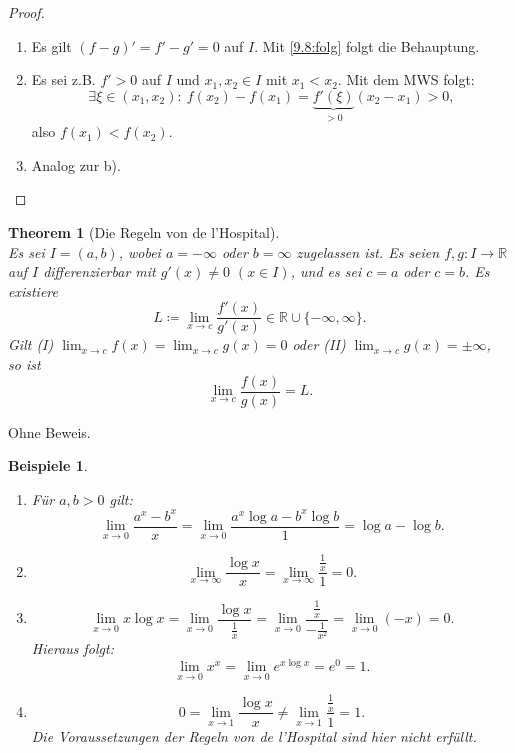 \documentclass[12pt]{extreport} %
\newcommand{\R}{\mathbb{R}}
\theoremstyle{named}
\newtheorem{unnamedtheorem}{Theorem} \counterwithin{unnamedtheorem}{chapter}
\theoremstyle{itshape}
\theoremstyle{normal}
\newtheorem*{beispiele}{Beispiele}
\begin{document}
{\begin{proof}  ~\
	\begin{enumerate}
		\item Es gilt $(f - g)' = f'-g'=0$ auf $I$. Mit \ref{9.8:folg} folgt die Behauptung.
		\item Es sei z.B. $f' > 0$ auf $I$ und $x_{1}, x_{2} \in I$ mit $x_{1} < x_{2}$. Mit dem MWS folgt: 
		$$\exists \xi \in (x_{1}, x_{2}): ~ f(x_{2}) - f(x_{1}) = \underbrace{f'(\xi)}_{> 0} (x_{2} - x_{1}) > 0,$$
		also $f(x_{1}) < f(x_{2})$.
		\item Analog zur b).
	\end{enumerate}
\end{proof}


\begin{unnamedtheorem}[Die Regeln von de l'Hospital] \label{9.11:prop:lHopital} ~\\
	Es sei $I = (a, b)$, wobei $a = -\infty$ oder $b = \infty$ zugelassen ist. Es seien $f, g \colon I \rightarrow \R$ auf $I$ differenzierbar mit 
	$g'(x) \neq 0$ $(x \in I)$, und es sei $c=a$ oder $c=b$. 
	Es existiere
	$$ L \coloneqq \lim_{x \rightarrow c} \frac{f'(x)}{g'(x)}  \in \R \cup \{ - \infty, \infty \}. $$
	Gilt (I) $\lim_{x \rightarrow c} f(x) = \lim_{x \rightarrow c} g(x) = 0$ oder (II) $\lim_{x \rightarrow c} g(x) = \pm \infty$, \\
	so ist 
	$$ \lim_{x \rightarrow c} \frac{f(x)}{g(x)} = L. $$
	\end{unnamedtheorem}

Ohne Beweis.

\begin{beispiele} ~\
	\begin{enumerate}
		\item Für $a, b > 0$ gilt:
		$$\lim_{x \rightarrow 0} \frac{a^{x} - b^{x}}{x} = \lim_{x \rightarrow 0} \frac{a^{x} \log a - b^{x} \log b}{1} = \log a - \log b.$$
		\item $$\lim_{x \rightarrow \infty} \frac{\log x}{x} = \lim_{x \rightarrow \infty} \frac{\frac{1}{x}}{1} = 0.$$
		\item $$\lim_{x \rightarrow 0} x \log x = \lim_{x \rightarrow 0} \frac{\log x}{\frac{1}{x}} 
		= \lim_{x \rightarrow 0} \frac{\frac{1}{x}}{-\frac{1}{x^{2}}} = \lim_{x \rightarrow 0} (-x) = 0.$$
		Hieraus folgt:
		$$\lim_{x \rightarrow 0} x^{x} = \lim_{x \rightarrow 0} e^{x \log x} = e^{0} = 1.$$
		\item  $$0=\lim_{x \rightarrow 1} \frac{\log x }{x} \not= \lim_{x \rightarrow 1} \frac{\frac{1}{x}}{1} = 1.$$
		Die Voraussetzungen der Regeln von de l'Hospital sind hier nicht erfüllt.
	\end{enumerate}
\end{beispiele}


}
\end{document}
